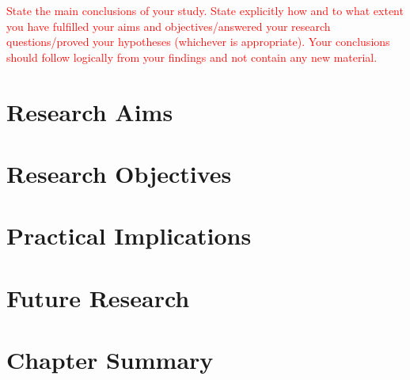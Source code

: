 \textcolor{red}{State the main conclusions of your study. State explicitly how and to what extent you have fulfilled your aims and objectives/answered your research questions/proved your hypotheses (whichever is appropriate). Your conclusions should follow logically from your findings and not contain any new material.}

\section{Research Aims}

\section{Research Objectives}

\section{Practical Implications}

\section{Future Research}

\section{Chapter Summary}

